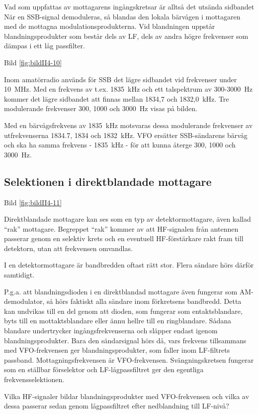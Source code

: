 Vad som uppfattas av mottagarens ingångskretsar är alltså det utsända
sidbandet När en SSB-signal demoduleras, så blandas den lokala
bärvågen i mottagaren med de mottagna modulationsprodukterna.  Vid
blandningen uppstår blandningsprodukter som består dels av LF, dels av
andra högre frekvenser som dämpas i ett låg passfilter.

Bild \ref{fig:bildII4-10}

Inom amatörradio används för SSB det lägre sidbandet vid frekvenser
under 10~MHz.  Med en frekvens av t.ex. 1835~kHz och ett talspektrum
av 300-3000~Hz kommer det lägre sidbandet att finnas mellan 1834,7 och
1832,0~kHz. Tre modulerande frekvenser 300, 1000 och 3000~Hz visas på
bilden.

Med en bärvågsfrekvens av 1835~kHz motsvaras dessa modulerande
frekvenser av utfrekvenserna 1834.7, 1834 och 1832~kHz. VFO ersätter
SSB-sändarens bärvåg och ska ha samma frekvens - 1835~kHz - för att
kunna återge 300, 1000 och 3000~Hz.

\subsection{Selektionen i direktblandade mottagare}

Bild \ref{fig:bildII4-11}

Direktblandade mottagare kan ses som en typ av detektormottagare, även
kallad ``rak'' mottagare. Begreppet ``rak'' kommer av att HF-signalen från
antennen passerar genom en selektiv krets och en eventuell
HF-förstärkare rakt fram till detektorn, utan att frekvensen omvandlas.

I en detektormottagare är bandbredden oftast rätt stor. Flera sändare
hörs därför samtidigt.

P.g.a. att blandningsdioden i en direktblandad mottagare även fungerar
som AM-demodulator, så hörs faktiskt alla sändare inom förkretsens
bandbredd. Detta kan undvikas till en del genom att dioden, som
fungerar som entaktsblandare, byts till en mottaktsblandare eller ännu
hellre till en ringblandare. Sådana blandare undertrycker
ingångsfrekvenserna och släpper endast igenom
blandningsprodukter. Bara den sändarsignal hörs då, vars frekvens
tillsammans med VFO-frekvensen ger blandningsprodukter, som faller
inom LF-filtrets passband. Mottagningsfrekvensen är
VFO-frekvensen. Svängningskretsen fungerar som en ställbar förselektor
och LF-lågpassfiltret ger den egentliga frekvensselektionen.

Vilka HF-signaler bildar blandningsprodukter med VFO-frekvensen och
vilka av dessa passerar sedan genom lågpassfiltret efter nedblandning
till LF-nivå?

